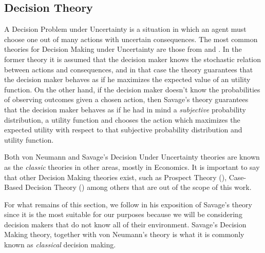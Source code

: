 \documentclass[11pt]{article}
\theoremstyle{plain}
\begin{document}
	\subsection{Decision Theory}
	A Decision Problem under Uncertainty is a situation in which an agent must choose one out of many actions with uncertain consequences. The most common theories for Decision Making under Uncertainty are those from \cite{von1944theory} and \cite{savage1954the}. In the former theory it is assumed that the decision maker knows the stochastic relation between actions and consequences, and in that case the theory guarantees that the decision maker behaves as if he maximizes the expected value of an utility function. On the other hand, if the decision maker doesn't know the probabilities of observing outcomes given a chosen action, then Savage's theory guarantees that the decision maker behaves as if he had in mind a \textit{subjective} probability distribution, a utility function and chooses the action which maximizes the expected utility with respect to that subjective probability distribution and utility function. 
	
Both von Neumann and Savage's Decision Under Uncertainty theories are known as the \textit{classic} theories in other areas, mostly in Economics. It is important to say that other Decision Making theories exist, such as Prospect Theory (\cite{kahneman1979prospect}), Case-Based Decision Theory (\cite{gilboa1995case}) among others that are out of the scope of this work.

For what remains of this section, we follow \cite{bernardo2000bayesian} in his exposition of Savage's theory since it is the most suitable for our purposes because we will be considering decision makers that do not know all of their environment. Savage's Decision Making theory, together with von Neumann's theory is what it is commonly known as \textit{classical} decision making. 
	
\end{document}
